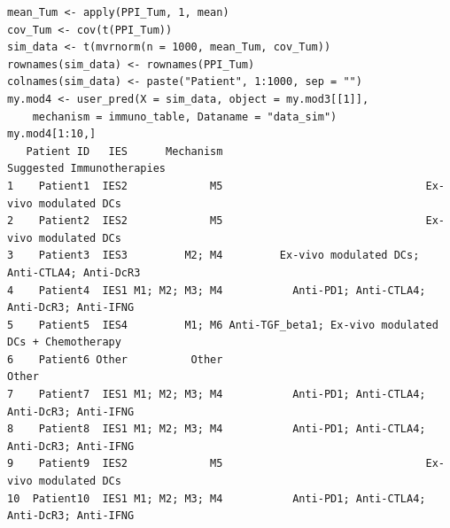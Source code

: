 \documentclass[a4paper, 11pt]{article}
\begin{document}
\begin{lstlisting}
mean_Tum <- apply(PPI_Tum, 1, mean)
cov_Tum <- cov(t(PPI_Tum))
sim_data <- t(mvrnorm(n = 1000, mean_Tum, cov_Tum))
rownames(sim_data) <- rownames(PPI_Tum)
colnames(sim_data) <- paste("Patient", 1:1000, sep = "")
my.mod4 <- user_pred(X = sim_data, object = my.mod3[[1]], 
	mechanism = immuno_table, Dataname = "data_sim")
my.mod4[1:10,]
   Patient ID   IES      Mechanism                            Suggested Immunotherapies
1    Patient1  IES2             M5                                Ex-vivo modulated DCs
2    Patient2  IES2             M5                                Ex-vivo modulated DCs
3    Patient3  IES3         M2; M4         Ex-vivo modulated DCs; Anti-CTLA4; Anti-DcR3
4    Patient4  IES1 M1; M2; M3; M4           Anti-PD1; Anti-CTLA4; Anti-DcR3; Anti-IFNG
5    Patient5  IES4         M1; M6 Anti-TGF_beta1; Ex-vivo modulated DCs + Chemotherapy
6    Patient6 Other          Other                                                Other
7    Patient7  IES1 M1; M2; M3; M4           Anti-PD1; Anti-CTLA4; Anti-DcR3; Anti-IFNG
8    Patient8  IES1 M1; M2; M3; M4           Anti-PD1; Anti-CTLA4; Anti-DcR3; Anti-IFNG
9    Patient9  IES2             M5                                Ex-vivo modulated DCs
10  Patient10  IES1 M1; M2; M3; M4           Anti-PD1; Anti-CTLA4; Anti-DcR3; Anti-IFNG
\end{lstlisting}
\end{document}
